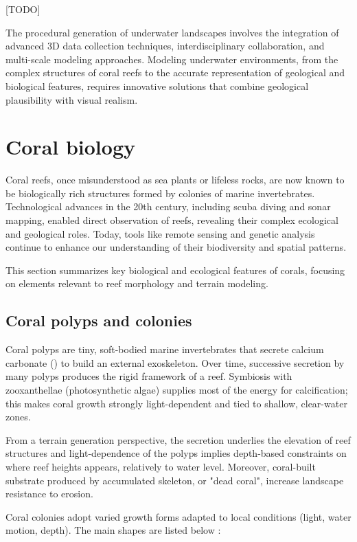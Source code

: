 [TODO]

The procedural generation of underwater landscapes involves the integration of advanced 3D data collection techniques, interdisciplinary collaboration, and multi-scale modeling approaches. Modeling underwater environments, from the complex structures of coral reefs to the accurate representation of geological and biological features, requires innovative solutions that combine geological plausibility with visual realism.


\section{Coral biology}
\label{sec:state-of-the-art_biology}

Coral reefs, once misunderstood as sea plants or lifeless rocks, are now known to be biologically rich structures formed by colonies of marine invertebrates. Technological advances in the 20th century, including scuba diving and sonar mapping, enabled direct observation of reefs, revealing their complex ecological and geological roles. Today, tools like remote sensing and genetic analysis continue to enhance our understanding of their biodiversity and spatial patterns.

This section summarizes key biological and ecological features of corals, focusing on elements relevant to reef morphology and terrain modeling.


\subsection{Coral polyps and colonies}
Coral polyps are tiny, soft-bodied marine invertebrates that secrete calcium carbonate () to build an external exoskeleton. Over time, successive secretion by many polyps produces the rigid framework of a reef. Symbiosis with zooxanthellae (photosynthetic algae) supplies most of the energy for calcification; this makes coral growth strongly light-dependent and tied to shallow, clear-water zones. 

From a terrain generation perspective, the  secretion underlies the elevation of reef structures and light-dependence of the polyps implies depth-based constraints on where reef heights appears, relatively to water level. Moreover, coral-built substrate produced by accumulated skeleton, or "dead coral", increase landscape resistance to erosion.

Coral colonies adopt varied growth forms adapted to local conditions (light, water motion, depth). The main shapes are listed below :

